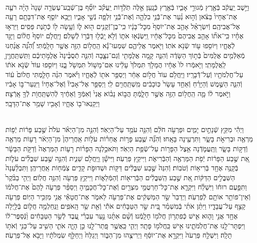 \documentclass[twoside, openany, parskip=half, 11pt]{book}
\begin{document}
\begin{sometimes}
\begin{footnotesize}
\begin{multicols}{2}
\\
וַיֵּ֣שֶׁב יַֽעֲקֹ֔ב בְּֿאֶ֖רֶץ מְֿגוּרֵ֣י אָבִ֑יו בְּֿאֶ֖רֶץ כְּֿנָֽעַן׃ אֵ֣לֶּה תֹּֽלְֿד֣וֹת יַֽעֲקֹ֗ב יוֹסֵ֞ף בֶּן־שְֿׁבַֽע־עֶשְׂרֵ֤ה שָׁנָה֙ הָיָ֨ה רֹעֶ֤ה אֶת־אֶחָיו֙ בַּצֹּ֔אן וְֿה֣וּא נַ֗עַר אֶת־בְּֿֿנֵ֥י בִלְהָ֛ה וְֿאֶת־בְּֿֿנֵ֥י זִלְפָּ֖ה נְֿשֵׁ֣י אָבִ֑יו וַיָּבֵ֥א יוֹסֵ֛ף אֶת־דִּבָּתָ֥ם רָעָ֖ה אֶל־אֲבִיהֶֽם׃ וְֿיִשְׂרָאֵ֗ל אָהַ֤ב אֶת־יוֹסֵף֙ מִכׇּל־בָּנָ֔יו כִּֽי־בֶן־זְֿקֻנִ֥ים ה֖וּא ל֑וֹ וְֿעָ֥שָׂה ל֖וֹ כְּֿתֹ֥נֶת פַּסִּֽים׃  וַיִּרְא֣וּ אֶחָ֗יו כִּֽי־אֹת֞וֹ אָהַ֤ב אֲבִיהֶם֙ מִכׇּל־אֶחָ֔יו וַֽיִּשְׂנְֿא֖וּ אֹת֑וֹ וְֿלֹ֥א יָֽכְֿל֖וּ דַּבְּֿר֥וֹ לְֿשָׁלֹֽם׃ וַיַּֽחֲלֹ֤ם יוֹסֵף֙ חֲל֔וֹם וַיַּגֵּ֖ד לְֿאֶחָ֑יו וַיּוֹסִ֥פוּ ע֖וֹד שְֿׂנֹ֥א אֹתֽוֹ׃ וַיֹּ֖אמֶר אֲלֵיהֶ֑ם שִׁמְעוּ־נָ֕א הַֽחֲל֥וֹם הַזֶּ֖ה אֲשֶׁ֥ר חָלָֽמְֿתִּי׃ וְֿ֠הִנֵּ֠ה אֲנַ֜חְנוּ מְֿאַלְּֿמִ֤ים אֲלֻמִּים֙ בְּֿת֣וֹךְ הַשָּׂדֶ֔ה וְֿהִנֵּ֛ה קָ֥מָה אֲלֻמָּתִ֖י וְֿגַם־נִצָּ֑בָה וְֿהִנֵּ֤ה תְֿסֻבֶּ֨ינָה֙ אֲלֻמֹּ֣תֵיכֶ֔ם וַתִּֽשְׁתַּֽחֲוֶ֖יןָ לַֽאֲלֻמָּתִֽי׃  וַיֹּ֤אמְֿרוּ לוֹ֙ אֶחָ֔יו הֲמָלֹ֤ךְ תִּמְלֹךְ֙ עָלֵ֔ינוּ אִם־מָשׁ֥וֹל תִּמְשֹׁ֖ל בָּ֑נוּ וַיּוֹסִ֤פוּ עוֹד֙ שְֿׂנֹ֣א אֹת֔וֹ עַל־חֲלֹֽמֹתָ֖יו וְֿעַל־דְּֿֿבָרָֽיו׃ וַיַּֽחֲלֹ֥ם עוֹד֙ חֲל֣וֹם אַחֵ֔ר וַיְסַפֵּ֥ר אֹת֖וֹ לְֿאֶחָ֑יו וַיֹּ֗אמֶר הִנֵּ֨ה חָלַ֤מְתִּי חֲלוֹם֙ ע֔וֹד וְֿהִנֵּ֧ה הַשֶּׁ֣מֶשׁ וְֿהַיָּרֵ֗חַ וְֿאַחַ֤ד עָשָׂר֙ כּֽוֹכָבִ֔ים מִֽשְׁתַּֽחֲוִ֖ים לִֽי׃ וַיְסַפֵּ֣ר אֶל־אָבִיו֘ וְֿאֶל־אֶחָיו֒ וַיִּגְעַר־בּ֣וֹ אָבִ֔יו וַיֹּ֣אמֶר ל֔וֹ מָ֛ה הַֽחֲל֥וֹם הַזֶּ֖ה אֲשֶׁ֣ר חָלָ֑מְֿתָּ הֲב֣וֹא נָב֗וֹא אֲנִי֙ וְֿאִמְּֿךָ֣ וְֿאַחֶ֔יךָ לְֿהִשְׁתַּֽחֲוֹ֖ת לְֿךָ֖ אָֽרְֿצָה׃ וַיְקַנְאוּ־ב֖וֹ אֶחָ֑יו וְֿאָבִ֖יו שָׁמַ֥ר אֶת־הַדָּבָֽר׃

\\
וַיְהִ֕י מִקֵּ֖ץ שְֿׁנָתַ֣יִם יָמִ֑ים וּפַרְעֹ֣ה חֹלֵ֔ם וְֿהִנֵּ֖ה עֹמֵ֥ד עַל־הַיְאֹֽר׃ וְֿהִנֵּ֣ה מִן־הַיְאֹ֗ר עֹלֹת֙ שֶׁ֣בַע פָּר֔וֹת יְֿפ֥וֹת מַרְאֶ֖ה וּבְרִיאֹ֣ת בָּשָׂ֑ר וַתִּרְעֶ֖ינָה בָּאָֽחוּ׃ וְֿהִנֵּ֞ה שֶׁ֧בַע פָּר֣וֹת אֲחֵר֗וֹת עֹל֤וֹת אַֽחֲרֵיהֶן֙ מִן־הַיְאֹ֔ר רָע֥וֹת מַרְאֶ֖ה וְֿדַקּ֣וֹת בָּשָׂ֑ר וַֽתַּֽעֲמֹ֛דְֿנָה אֵ֥צֶל הַפָּר֖וֹת עַל־שְֿׂפַ֥ת הַיְאֹֽר׃ וַתֹּאכַ֣לְנָה הַפָּר֗וֹת רָע֤וֹת הַמַּרְאֶה֙ וְֿדַקֹּ֣ת הַבָּשָׂ֔ר אֵ֚ת שֶׁ֣בַע הַפָּר֔וֹת יְֿפֹ֥ת הַמַּרְאֶ֖ה וְֿהַבְּֿרִיאֹ֑ת וַיִּיקַ֖ץ פַּרְעֹֽה׃  וַיִּישָׁ֕ן וַֽיַּֽחֲלֹ֖ם שֵׁנִ֑ית וְֿהִנֵּ֣ה שֶׁ֣בַע שִׁבֳּלִ֗ים עֹל֛וֹת בְּֿקָנֶ֥ה אֶחָ֖ד בְּֿרִיא֥וֹת וְֿטֹבֽוֹת׃ וְֿהִנֵּה֙ שֶׁ֣בַע שִׁבֳּלִ֔ים דַּקּ֖וֹת וּשְׁדוּפֹ֣ת קָדִ֑ים צֹֽמְֿח֖וֹת אַֽחֲרֵיהֶֽן׃ וַתִּבְלַ֨עְנָה֙ הַשִּׁבֳּלִ֣ים הַדַּקּ֔וֹת אֵ֚ת שֶׁ֣בַע הַֽשִּׁבֳּלִ֔ים הַבְּֿרִיא֖וֹת וְֿהַמְּֿלֵא֑וֹת וַיִּיקַ֥ץ פַּרְעֹ֖ה וְֿהִנֵּ֥ה חֲלֽוֹם׃  וַיְהִ֤י בַבֹּ֨קֶר֙ וַתִּפָּ֣עֶם רוּח֔וֹ וַיִּשְׁלַ֗ח וַיִּקְרָ֛א אֶת־כׇּל־חַרְטֻמֵּ֥י מִצְרַ֖יִם וְֿאֶת־כׇּל־חֲכָמֶ֑יהָ וַיְסַפֵּ֨ר פַּרְעֹ֤ה לָהֶם֙ אֶת־חֲלֹמ֔וֹ וְֿאֵין־פּוֹתֵ֥ר אוֹתָ֖ם לְֿפַרְעֹֽה׃ וַיְדַבֵּר֙ שַׂ֣ר הַמַּשְׁקִ֔ים אֶת־פַּרְעֹ֖ה לֵאמֹ֑ר אֶת־חֲטָאַ֕י אֲנִ֖י מַזְכִּ֥יר הַיּֽוֹם׃ פַּרְעֹ֖ה קָצַ֣ף עַל־עֲבָדָ֑יו וַיִּתֵּ֨ן אֹתִ֜י בְּֿמִשְׁמַ֗ר בֵּ֚ית שַׂ֣ר הַטַּבָּחִ֔ים אֹתִ֕י וְֿאֵ֖ת שַׂ֥ר הָֽאֹפִֽים׃ וַנַּֽחַלְמָ֥ה חֲל֛וֹם בְּֿלַ֥יְלָה אֶחָ֖ד אֲנִ֣י וָה֑וּא אִ֛ישׁ כְּֿפִתְר֥וֹן חֲלֹמ֖וֹ חָלָֽמְֿנוּ׃ וְֿשָׁ֨ם אִתָּ֜נוּ נַ֣עַר עִבְרִ֗י עֶ֚בֶד לְֿשַׂ֣ר הַטַּבָּחִ֔ים וַ֨נְּֿסַפֶּר־ל֔וֹ וַיִּפְתָּר־לָ֖נוּ אֶת־חֲלֹֽמֹתֵ֑ינוּ אִ֥ישׁ כַּֽחֲלֹמ֖וֹ פָּתָֽר׃ וַיְהִ֛י כַּֽאֲשֶׁ֥ר פָּֽתַר־לָ֖נוּ כֵּ֣ן הָיָ֑ה אֹתִ֛י הֵשִׁ֥יב עַל־כַּנִּ֖י וְֿאֹת֥וֹ תָלָֽה׃ וַיִּשְׁלַ֤ח פַּרְעֹה֙ וַיִּקְרָ֣א אֶת־יוֹסֵ֔ף וַיְרִיצֻ֖הוּ מִן־הַבּ֑וֹר וַיְגַלַּח֙ וַיְחַלֵּ֣ף שִׂמְלֹתָ֔יו וַיָּבֹ֖א אֶל־פַּרְעֹֽה׃


\end{multicols}
\end{footnotesize}
\end{sometimes}
\end{document}
